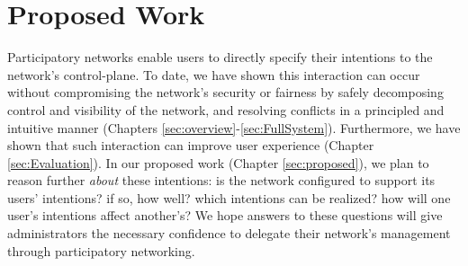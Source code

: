 \begin{comment}

\vskip 0.5em

In summary, this thesis makes the following contributions:

\begin{enumerate}


\item We implement a fully-functioning SDN controller which allows a
network's administrators to safely delegate their authority using our API.

\item We analyze a previously proposed algorithm for consolidating
hierarchical policies, and propose a new algorithm that reduces the complexity
from exponential to polynomial.

\item We demonstrate our system's usefulness and
practicality on a real OpenFlow testbed using 
microbenchmarks and four real applications enhanced with our API.


\end{enumerate}

\end{comment}

\section{Proposed Work}

Participatory networks enable users to directly specify their intentions to
the network's control-plane. To date, we have shown this interaction
can occur without compromising the network's security or fairness by
safely decomposing control and visibility of the network, and resolving 
conflicts in a principled and intuitive manner
(Chapters \ref{sec:overview}-\ref{sec:FullSystem}).
Furthermore, we have shown that such interaction
can improve user experience (Chapter \ref{sec:Evaluation}).
In our proposed work (Chapter \ref{sec:proposed}), we plan to reason further \emph{about} these intentions:
is the network configured to support its users' intentions? if so, how well?
which intentions can be realized? how will one user's intentions affect another's?
We hope answers to these questions will give administrators the necessary confidence to
delegate their network's management through participatory networking.
